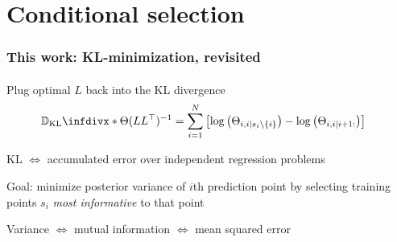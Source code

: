 \documentclass{beamer}                             %
\newcommand*{\CM}{\Theta}
\newcommand*{\KL}{\mathbb{D}_{\operatorname{KL}}\infdivx}
\newenvironment{wideitemize}
  {\itemize\setlength{\itemsep}{0.5cm}}
  {\enditemize}
\begin{document}
\begin{frame}
{}
\end{frame}

\section{Conditional selection}

\begin{frame}
\frametitle{This work: KL-minimization, revisited}
\framesubtitle{}

\begin{wideitemize}
  \item<+-> Plug optimal \( L \) back into the KL divergence
    \begin{align*}
      \KL*{\CM}{(L L^{\top})^{-1}} &=
        \sum_{i = 1}^N
          \left [
            \log \left ( \CM_{i, i \mid s_i \setminus \{ i \}} \right ) -
            \log \left ( \CM_{i, i \mid i + 1:} \right )
          \right ]
    \end{align*}
  \item<+-> KL \( \Leftrightarrow \) accumulated
    error over independent regression problems
  \item<+-> Goal: minimize posterior variance of \( i
    \)th prediction point by selecting training points
    \( s_i \) \emph{most informative} to that point
  \item<3->
    Variance \( \Leftrightarrow \) mutual information
    \( \Leftrightarrow \) mean squared error
\end{wideitemize}

\end{frame}
\end{document}
